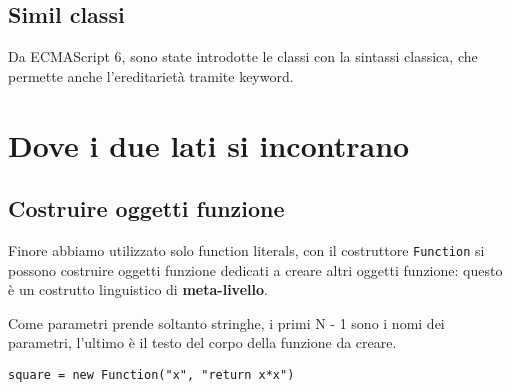 \subsection{Simil classi}
Da ECMAScript 6, sono state introdotte le classi con la sintassi classica, che permette anche l'ereditarietà tramite keyword.

\section{Dove i due lati si incontrano}

\subsection{Costruire oggetti funzione}
Finore abbiamo utilizzato solo function literals, con il costruttore \texttt{Function} si possono costruire oggetti funzione dedicati a creare altri oggetti funzione: questo è un costrutto linguistico di \textbf{meta-livello}.

Come parametri prende soltanto stringhe, i primi N - 1 sono i nomi dei parametri, l'ultimo è il testo del corpo della funzione da creare.

\begin{verbatim}
square = new Function("x", "return x*x")
\end{verbatim}



















